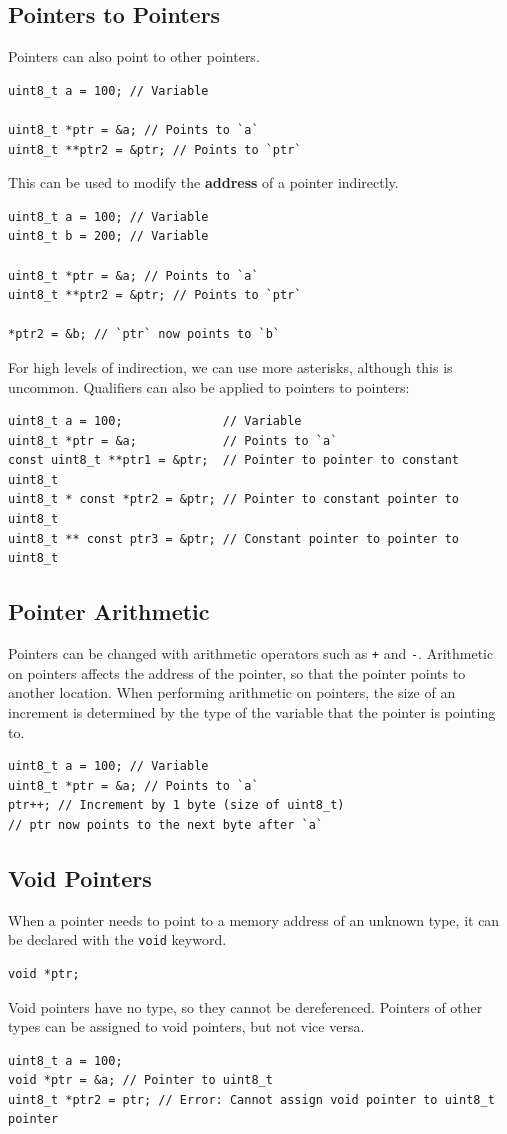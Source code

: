 \documentclass{report}
\begin{document}
\subsection{Pointers to Pointers}
Pointers can also point to other pointers.
\begin{verbatim}
uint8_t a = 100; // Variable

uint8_t *ptr = &a; // Points to `a`
uint8_t **ptr2 = &ptr; // Points to `ptr`
\end{verbatim}
This can be used to modify the \textbf{address} of a pointer indirectly.
\begin{verbatim}
uint8_t a = 100; // Variable
uint8_t b = 200; // Variable

uint8_t *ptr = &a; // Points to `a`
uint8_t **ptr2 = &ptr; // Points to `ptr`

*ptr2 = &b; // `ptr` now points to `b`
\end{verbatim}
For high levels of indirection, we can use more asterisks, although this is uncommon.
Qualifiers can also be applied to pointers to pointers:
\begin{verbatim}
uint8_t a = 100;              // Variable
uint8_t *ptr = &a;            // Points to `a`
const uint8_t **ptr1 = &ptr;  // Pointer to pointer to constant uint8_t
uint8_t * const *ptr2 = &ptr; // Pointer to constant pointer to uint8_t
uint8_t ** const ptr3 = &ptr; // Constant pointer to pointer to uint8_t
\end{verbatim}
\subsection{Pointer Arithmetic}
Pointers can be changed with arithmetic operators such as \texttt{+} and \texttt{-}.
Arithmetic on pointers affects the address of the pointer, so that the pointer points to another location.
When performing arithmetic on pointers, the size of an increment is determined by the type of the variable
that the pointer is pointing to.
\begin{verbatim}
uint8_t a = 100; // Variable
uint8_t *ptr = &a; // Points to `a`
ptr++; // Increment by 1 byte (size of uint8_t)
// ptr now points to the next byte after `a`
\end{verbatim}
\subsection{Void Pointers}
When a pointer needs to point to a memory address of an unknown type, it
can be declared with the \texttt{void} keyword.
\begin{verbatim}
void *ptr;
\end{verbatim}
Void pointers have no type, so they cannot be dereferenced.
Pointers of other types can be assigned to void pointers, but not vice versa.
\begin{verbatim}
uint8_t a = 100;
void *ptr = &a; // Pointer to uint8_t
uint8_t *ptr2 = ptr; // Error: Cannot assign void pointer to uint8_t pointer
\end{verbatim}
\end{document}
